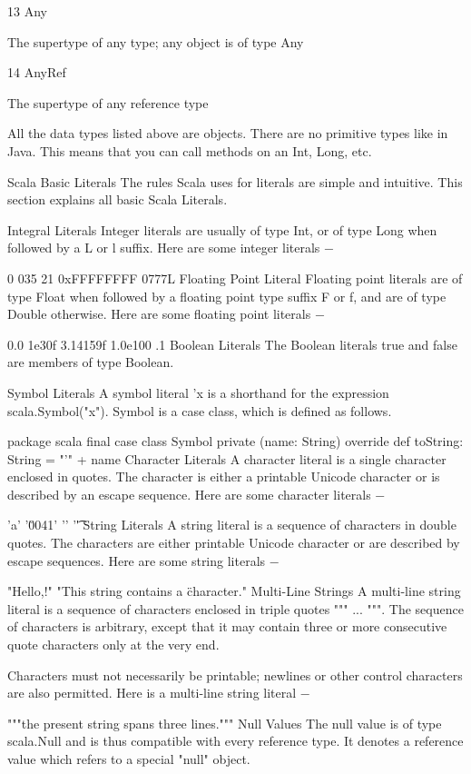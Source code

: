 13	
Any

The supertype of any type; any object is of type Any

14	
AnyRef

The supertype of any reference type

All the data types listed above are objects. There are no primitive types like in Java. This means that you can call methods on an Int, Long, etc.

Scala Basic Literals
The rules Scala uses for literals are simple and intuitive. This section explains all basic Scala Literals.

Integral Literals
Integer literals are usually of type Int, or of type Long when followed by a L or l suffix. Here are some integer literals −

0
035
21 
0xFFFFFFFF 
0777L
Floating Point Literal
Floating point literals are of type Float when followed by a floating point type suffix F or f, and are of type Double otherwise. Here are some floating point literals −

0.0 
1e30f 
3.14159f 
1.0e100
.1
Boolean Literals
The Boolean literals true and false are members of type Boolean.

Symbol Literals
A symbol literal 'x is a shorthand for the expression scala.Symbol("x"). Symbol is a case class, which is defined as follows.

package scala
final case class Symbol private (name: String) {
   override def toString: String = "'" + name
}
Character Literals
A character literal is a single character enclosed in quotes. The character is either a printable Unicode character or is described by an escape sequence. Here are some character literals −

'a' 
'\u0041'
'\n'
'\t'
String Literals
A string literal is a sequence of characters in double quotes. The characters are either printable Unicode character or are described by escape sequences. Here are some string literals −

"Hello,\nWorld!"
"This string contains a \" character."
Multi-Line Strings
A multi-line string literal is a sequence of characters enclosed in triple quotes """ ... """. The sequence of characters is arbitrary, except that it may contain three or more consecutive quote characters only at the very end.

Characters must not necessarily be printable; newlines or other control characters are also permitted. Here is a multi-line string literal −

"""the present string
spans three
lines."""
Null Values
The null value is of type scala.Null and is thus compatible with every reference type. It denotes a reference value which refers to a special "null" object.

